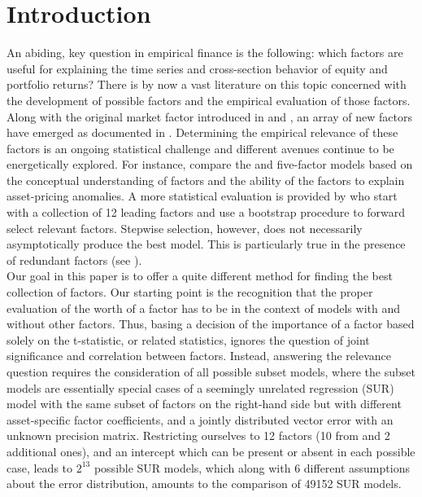 \documentclass[12pt]{article}
\begin{document}
\section{Introduction}
  An abiding, key question in empirical finance is the following: which factors are useful for explaining the time series and cross-section behavior of equity and portfolio returns? There is by now a vast literature on this topic concerned with the development of possible factors and the empirical evaluation of those factors. Along with the original market factor introduced in \cite{sharpe1964capital} and \cite{lintner1965valuation}, an array of new factors have emerged as documented in \cite{harvey2015and}. Determining the empirical relevance of these factors is an ongoing statistical challenge and different avenues continue to be energetically explored. For instance, \cite{hou2014comparison} compare the \cite{hou2014digesting} and   \cite{fama2015five} five-factor models based on the conceptual understanding of factors and the ability of the factors to explain asset-pricing anomalies.  A more statistical evaluation is provided by \cite{harvey2015lucky} who start with a collection of 12 leading factors and use a bootstrap procedure to forward select relevant factors. Stepwise selection, however, does not necessarily asymptotically produce the best model. This is particularly true in the presence of redundant factors (see \cite{judd2011data}). \\
  Our goal in this paper is to offer a quite different method for finding the best collection of factors. Our starting point is the recognition that the proper evaluation of the worth of a factor has to be in the context of models with and without other factors. Thus, basing a decision of the importance of a factor based solely on the t-statistic, or related statistics, ignores the question of joint significance and correlation between factors. Instead, answering the relevance question requires the consideration of all possible subset models, where the subset models are essentially special cases of a seemingly unrelated regression (SUR) model with the same subset of factors on the right-hand side but with different asset-specific factor coefficients, and a jointly distributed vector error with an unknown precision matrix. Restricting ourselves to 12 factors (10 from \cite{harvey2015lucky} and 2 additional ones), 
  and an intercept which can be present or absent in each possible case, leads to $2^{13}$ possible SUR models, which along with 6 different assumptions about the error distribution, amounts to the comparison of 49152 SUR models.\\
\end{document}
